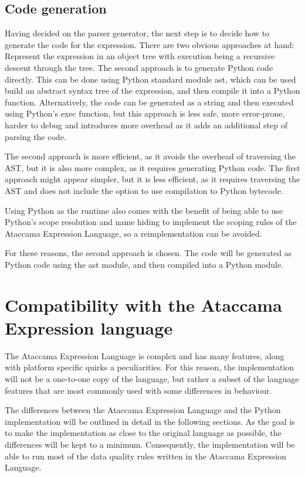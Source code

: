 \subsection{Code generation}

Having decided on the parser generator, the next step is to decide how to generate the code for the expression. There are two obvious approaches at hand: Represent the expression in an object tree with execution being a recursive descent through the tree. The second approach is to generate Python code directly. This can be done using Python standard module ast, which can be used build an abstract syntax tree of the expression, and then compile it into a Python function. Alternatively, the code can be generated as a string and then executed using Python's exec function, but this approach is less safe, more error-prone, harder to debug and introduces more overhead as it adds an additional step of parsing the code.

The second approach is more efficient, as it avoids the overhead of traversing the AST, but it is also more complex, as it requires generating Python code. The first approach might appear simpler, but it is less efficient, as it requires traversing the AST and does not include the option to use compilation to Python bytecode.

Using Python as the runtime also comes with the benefit of being able to use Python's scope resolution and name hiding to implement the scoping rules of the Ataccama Expression Language, so a reimplementation can be avoided.

For these reasons, the second approach is chosen. The code will be generated as Python code using the ast module, and then compiled into a Python module.

\section{Compatibility with the Ataccama Expression language}


The Ataccama Expression Language is complex and has many features, along with
platform specific quirks a peculiarities. For this reason, the implementation will
not be a one-to-one copy of the language, but rather a subset of the language
features that are most commonly used with some differences in behaviour.

The differences between the Ataccama Expression Language and the Python
implementation will be outlined in detail in the following sections. As the goal
is to make the implementation as close to the original language as possible, the
differences will be kept to a minimum. Consequently, the implementation will be
able to run most of the data quality rules written in the Ataccama Expression
Language.

